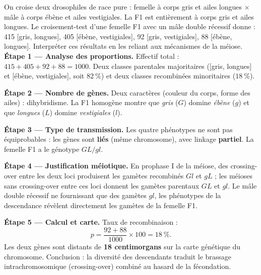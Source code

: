 \documentclass[11pt]{article}
\begin{document}
\begin{exoresolu}
On croise deux drosophiles de race pure : femelle à corps gris et ailes longues $\times$ mâle à corps ébène et ailes vestigiales. La F1 est entièrement à corps gris et ailes longues. Le croisement-test d'une femelle F1 avec un mâle double récessif donne : 415 [gris, longues], 405 [ébène, vestigiales], 92 [gris, vestigiales], 88 [ébène, longues]. Interpréter ces résultats en les reliant aux mécanismes de la méiose.
\tcblower
\textbf{Étape 1 — Analyse des proportions.} Effectif total : $415 + 405 + 92 + 88 = 1000$. Deux classes parentales majoritaires ([gris, longues] et [ébène, vestigiales], soit $82\ \%$) et deux classes recombinées minoritaires ($18\ \%$).

\textbf{Étape 2 — Nombre de gènes.} Deux caractères (couleur du corps, forme des ailes) : dihybridisme. La F1 homogène montre que \emph{gris} ($G$) domine \emph{ébène} ($g$) et que \emph{longues} ($L$) domine \emph{vestigiales} ($l$).

\textbf{Étape 3 — Type de transmission.} Les quatre phénotypes ne sont pas équiprobables : les gènes sont \textbf{liés} (même chromosome), avec linkage \textbf{partiel}. La femelle F1 a le génotype $GL/gl$.

\textbf{Étape 4 — Justification méiotique.} En prophase I de la méiose, des crossing-over entre les deux loci produisent les gamètes recombinés $Gl$ et $gL$ ; les méioses sans crossing-over entre ces loci donnent les gamètes parentaux $GL$ et $gl$. Le mâle double récessif ne fournissant que des gamètes $gl$, les phénotypes de la descendance révèlent directement les gamètes de la femelle F1.

\textbf{Étape 5 — Calcul et carte.} Taux de recombinaison :
\[ p = \frac{92 + 88}{1000} \times 100 = 18\ \%. \]
Les deux gènes sont distants de \textbf{18 centimorgans} sur la carte génétique du chromosome. Conclusion : la diversité des descendants traduit le brassage intrachromosomique (crossing-over) combiné au hasard de la fécondation.
\end{exoresolu}
\end{document}
